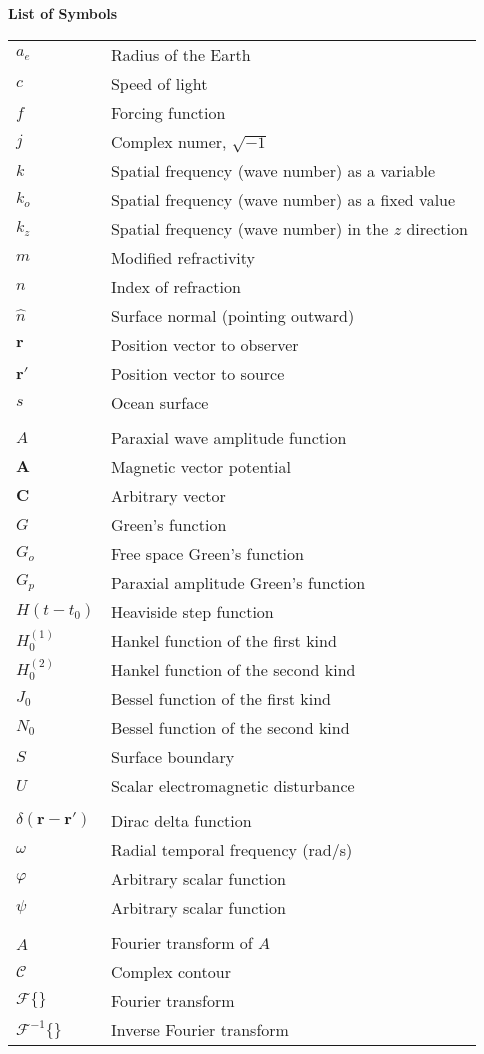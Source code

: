 \noindent\Large{\bf{List of Symbols}}

\vspace{24pt}

\small\normalsize
\begin{supertabular}{ll}
$a_e$ & Radius of the Earth \\
$c$ & Speed of light \\
$f$ & Forcing function \\
$j$ & Complex numer, $\sqrt{-1}$ \\
$k$ & Spatial frequency (wave number) as a variable\\
$k_o$ & Spatial frequency (wave number) as a fixed value \\
$k_z$ & Spatial frequency (wave number) in the $z$ direction \\
$m$ & Modified refractivity \\
$n$ & Index of refraction \\
$\hat{n}$ & Surface normal (pointing outward) \\
$\mathbf{r}$ & Position vector to observer \\
$\mathbf{r}'$ & Position vector to source \\
$s$ & Ocean surface \\
\\
$A$ & Paraxial wave amplitude function \\
$\mathbf{A}$ & Magnetic vector potential \\
$\mathbf{C}$ & Arbitrary vector \\
$G$ & Green's function \\
$G_o$ & Free space Green's function \\
$G_p$ & Paraxial amplitude Green’s function \\
$H(t-t_0)$ & Heaviside step function \\
$H_0^{(1)}$ & Hankel function of the first kind \\
$H_0^{(2)}$ & Hankel function of the second kind \\
$J_0$ & Bessel function of the first kind \\
$N_0$ & Bessel function of the second kind \\
$S$ & Surface boundary \\
$U$ & Scalar electromagnetic disturbance\\
\\
$\delta\left(\mathbf{r}-\mathbf{r}' \right)$ & Dirac delta function \\
$\omega$ & Radial temporal frequency (rad/s)\\
$\varphi$ & Arbitrary scalar function\\
$\psi$ & Arbitrary scalar function\\
\\
$\hat{A}$ & Fourier transform of $A$ \\
$\mathcal{C}$ & Complex contour \\
$\mathcal{F}\{\}$ & Fourier transform \\
$\mathcal{F}^{-1}\{\}$ & Inverse Fourier transform \\
\end{supertabular}